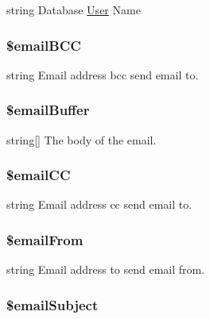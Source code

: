 string Database \hyperlink{class_user}{User} Name \hypertarget{class_debug_ace2c8fd77a23d56cfdc35a142df1b1ab}{
\subsubsection[{\$email\-B\-C\-C}]{\setlength{\rightskip}{0pt plus 5cm}\$email\-B\-C\-C\hspace{0.3cm}{\ttfamily [static]}}}\label{class_debug_ace2c8fd77a23d56cfdc35a142df1b1ab}
string Email address bcc send email to. \hypertarget{class_debug_a6da5505f5274a47a70fb0cbac5eef25e}{
\subsubsection[{\$email\-Buffer}]{\setlength{\rightskip}{0pt plus 5cm}\$email\-Buffer\hspace{0.3cm}{\ttfamily [static]}}}\label{class_debug_a6da5505f5274a47a70fb0cbac5eef25e}
string\mbox{[}\mbox{]} The body of the email. \hypertarget{class_debug_aef55490ba633a1821bc784c7c5e5a5e5}{
\subsubsection[{\$email\-C\-C}]{\setlength{\rightskip}{0pt plus 5cm}\$email\-C\-C\hspace{0.3cm}{\ttfamily [static]}}}\label{class_debug_aef55490ba633a1821bc784c7c5e5a5e5}
string Email address cc send email to. \hypertarget{class_debug_a8812e953c70aa15f8f01e0a83230e645}{
\subsubsection[{\$email\-From}]{\setlength{\rightskip}{0pt plus 5cm}\$email\-From\hspace{0.3cm}{\ttfamily [static]}}}\label{class_debug_a8812e953c70aa15f8f01e0a83230e645}
string Email address to send email from. \hypertarget{class_debug_afc4243e1cc62688011c169b622433f64}{
\subsubsection[{\$email\-Subject}]{\setlength{\rightskip}{0pt plus 5cm}\$email\-Subject\hspace{0.3cm}{\ttfamily [static]}}}\label{class_debug_afc4243e1cc62688011c169b622433f64}
